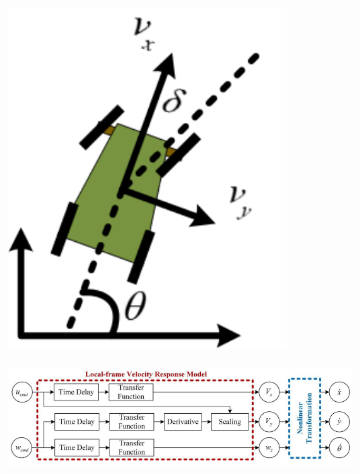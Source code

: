 \documentclass[../thesis.tex]{subfiles}
\begin{document}
\begin{figure}[t]
    	\centering
    	\begin{subfigure}[b]{0.18\linewidth}
    	 \includegraphics[width=\columnwidth]{./RRTPlanner/fig/vehicle_frame.png}
           	\subcaption{}
           	\label{fig:vehicle_model_frame}
    	\end{subfigure}
    	\begin{subfigure}[b]{0.8\linewidth}
    	 \includegraphics[width=\columnwidth]{./RRTPlanner/fig/vehicle_model_block.png}
           	\subcaption{}
           	\label{fig:vehicle_model_block}
    	\end{subfigure}
    	\begin{subfigure}[b]{0.8\linewidth}

\end{subfigure}
\end{figure}
\end{document}
